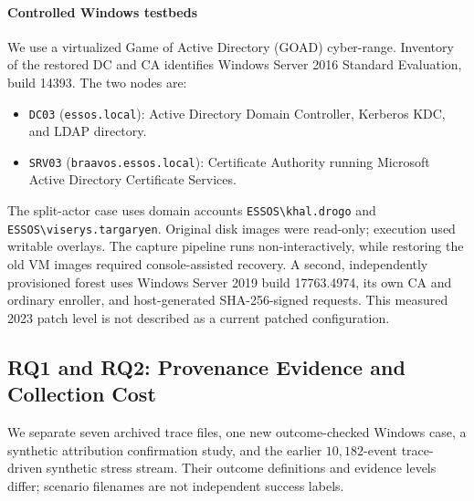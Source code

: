 \paragraph{Controlled Windows testbeds} We use a virtualized Game of Active Directory (GOAD) cyber-range. Inventory of the restored DC and CA identifies Windows Server 2016 Standard Evaluation, build 14393. The two nodes are:
\begin{itemize}
    \item \texttt{DC03} (\texttt{essos.local}): Active Directory Domain Controller, Kerberos KDC, and LDAP directory.
    \item \texttt{SRV03} (\texttt{braavos.essos.local}): Certificate Authority running Microsoft Active Directory Certificate Services.
\end{itemize}
The split-actor case uses domain accounts \texttt{ESSOS\textbackslash khal.drogo} and \texttt{ESSOS\textbackslash viserys.targaryen}. Original disk images were read-only; execution used writable overlays. The capture pipeline runs non-interactively, while restoring the old VM images required console-assisted recovery. A second, independently provisioned forest uses Windows Server 2019 build 17763.4974, its own CA and ordinary enroller, and host-generated SHA-256-signed requests. This measured 2023 patch level is not described as a current patched configuration.

\subsection{RQ1 and RQ2: Provenance Evidence and Collection Cost}
\label{sec:streaming_evaluation}
We separate seven archived trace files, one new outcome-checked Windows case, a synthetic attribution confirmation study, and the earlier $10,182$-event trace-driven synthetic stress stream. Their outcome definitions and evidence levels differ; scenario filenames are not independent success labels.

